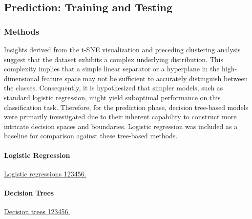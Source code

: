 \documentclass{article}
\begin{document}
\subsection{Prediction: Training and Testing}

\subsubsection*{Methods}

Insights derived from the t-SNE visualization and preceding clustering analysis suggest that the dataset exhibits a complex underlying distribution. This complexity implies that a simple linear separator or a hyperplane in the high-dimensional feature space may not be sufficient to accurately distinguish between the classes. Consequently, it is hypothesized that simpler models, such as standard logistic regression, might yield suboptimal performance on this classification task. Therefore, for the prediction phase, decision tree-based models were primarily investigated due to their inherent capability to construct more intricate decision spaces and boundaries. Logistic regression was included as a baseline for comparison against these tree-based methods.

\paragraph{Logistic Regression} \underline{Logistic regressions 123456.}

\paragraph{Decision Trees} \underline{Decision trees 123456.}
\end{document}
